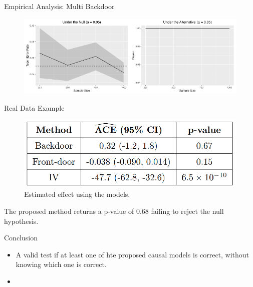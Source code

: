 \documentclass{beamer}
\begin{document}
\begin{frame}{Empirical Analysis: Multi Backdoor}
	\begin{figure}
		\center
		\includegraphics[scale=0.45]{multi_back.png}
	\end{figure}
\end{frame}

\begin{frame}{Real Data Example}
	\begin{figure}
		\center
		\includegraphics[scale=0.2]{table.png}
		\caption*{Estimated effect using the models.}
	\end{figure}

	The proposed method returns a p-value of 0.68 failing to reject the null hypothesis.
\end{frame}

\begin{frame}{Conclusion}
	\begin{itemize}
		\item A valid test if at least one of hte proposed causal models is correct, without knowing which one is correct.
		\item 
	\end{itemize}
\end{frame}
\end{document}
